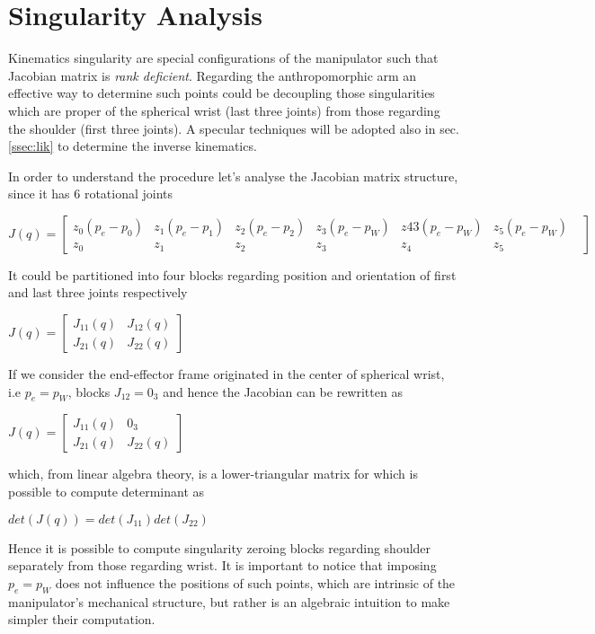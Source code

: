\section{Singularity Analysis}

Kinematics singularity are special configurations of the manipulator such that Jacobian matrix is \textit{rank deficient}. Regarding the anthropomorphic arm an effective way to determine such points could be decoupling those singularities which are proper of the spherical wrist (last three joints) from those regarding the shoulder (first three joints). A specular techniques will be adopted also in sec.\ref{ssec:lik} to determine the inverse kinematics.

In order to understand the procedure let's analyse the Jacobian matrix structure, since it has 6 rotational joints
\begin{center}
\footnotesize
$J(q)=\left[\begin{matrix}z_0(p_e-p_0)&z_1(p_e-p_1) & z_2(p_e-p_2) & z_3(p_e-p_W) & z43(p_e-p_W) & z_5(p_e-p_W) \\
z_0 & z_1 & z_2 & z_3 & z_4 & z_5 &
\end{matrix} \right]$
\end{center}

It could be partitioned into four blocks regarding position and orientation of first and last three joints respectively

\begin{center}
	$J(q) = \left[\begin{matrix}
	J_{11}(q) & J_{12}(q) \\
	J_{21}(q) & J_{22}(q) 
	\end{matrix}\right]$
\end{center}

If we consider the end-effector frame originated in the center of spherical wrist, i.e $p_e = p_W$, blocks $J_{12} = 0_3$ and hence the Jacobian can be rewritten as
 
\begin{center}
	$J(q) = \left[\begin{matrix}
	J_{11}(q) & 0_3 \\
	J_{21}(q) & J_{22}(q) 
	\end{matrix}\right]$
\end{center}
which, from linear algebra theory, is a lower-triangular matrix for which is possible to compute determinant as
\begin{center}
$det(J(q)) = det(J_{11})det(J_{22})$
\end{center}
Hence it is possible to compute singularity zeroing blocks regarding shoulder separately from those regarding wrist. It is important to notice that imposing $p_e = p_W$ does not influence the positions of such points, which are intrinsic of the manipulator's mechanical structure, but rather is an algebraic intuition to make simpler their computation.

